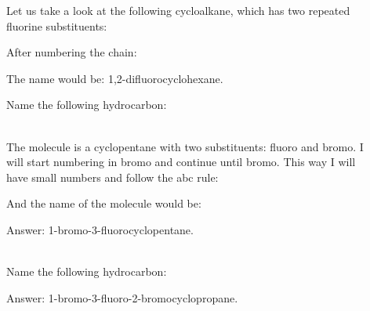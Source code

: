 \documentclass[main.tex]{subfiles}
\newcommand{\mytriangleright}[1]{\tikz{\filldraw[draw=#1,fill=#1] (0,0) --(0em,0.6em) -- (0.4em,0.3em);}}
\begin{document}
\begin{description}
\item[] Let us take a look at the following cycloalkane, which has two repeated fluorine substituents:
\begin{center} \end{center}
After numbering the chain:
\begin{center}\end{center}
The name would be: 1,2-difluorocyclohexane.
\begin{example} %
Name the following hydrocarbon:
\begin{center}\end{center}
\\
The molecule is a cyclopentane with two substituents: fluoro and bromo. I will start numbering in bromo and continue until bromo. This way I will have small numbers and follow the abc rule:
\begin{center}\end{center}
And the name of the molecule would be: 
\begin{flushright} \mytriangleright{dgreen}\small Answer: 1-bromo-3-fluorocyclopentane. \end{flushright}
\faDiamond\ \\
Name the following hydrocarbon:
\begin{center}\end{center}
\begin{flushright} \mytriangleright{dgreen}\small Answer: 1-bromo-3-fluoro-2-bromocyclopropane. \end{flushright}
\end{example}%


\end{description}
\end{document}

